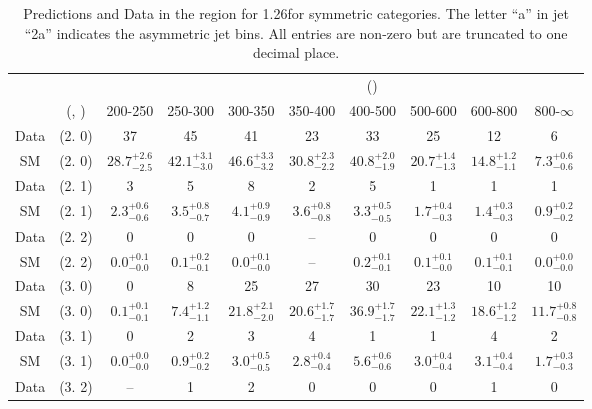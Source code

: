 \begin{table}[h!]
\tiny
\centering
\caption{Predictions and Data in the \mmj region for 1.26\ifb for symmetric categories. The letter ``a'' in jet \eg ``2a''  indicates the asymmetric jet bins. All entries are non-zero but are truncated to one decimal place.\label{tab:predall_mumu_comb_sym}}
\begin{tabular}
{cccccccccc}
	\hline\hline
&	&	& \multicolumn{8}{c}{\scalht (\gev)}\\ 
	&	 (\njet, \nb) & 200-250 & 250-300 & 300-350 & 350-400 & 400-500 & 500-600 & 600-800 & 800-$\infty$ \\ [0.8ex] 
\hline
	Data & (2. 0) & 37 & 45 & 41 & 23 & 33 & 25 & 12 & 6 \\[0.5ex] 
	SM & (2. 0) & $28.7^{+ 2.6 }_{- 2.5 }$ & $42.1^{+ 3.1 }_{- 3.0 }$ & $46.6^{+ 3.3 }_{- 3.2 }$ & $30.8^{+ 2.3 }_{- 2.2 }$ & $40.8^{+ 2.0 }_{- 1.9 }$ & $20.7^{+ 1.4 }_{- 1.3 }$ & $14.8^{+ 1.2 }_{- 1.1 }$ & $7.3^{+ 0.6 }_{- 0.6 }$ \\[0.5ex] 
	Data & (2. 1) & 3 & 5 & 8 & 2 & 5 & 1 & 1 & 1 \\[0.5ex] 
	SM & (2. 1) & $2.3^{+ 0.6 }_{- 0.6 }$ & $3.5^{+ 0.8 }_{- 0.7 }$ & $4.1^{+ 0.9 }_{- 0.9 }$ & $3.6^{+ 0.8 }_{- 0.8 }$ & $3.3^{+ 0.5 }_{- 0.5 }$ & $1.7^{+ 0.4 }_{- 0.3 }$ & $1.4^{+ 0.3 }_{- 0.3 }$ & $0.9^{+ 0.2 }_{- 0.2 }$ \\[0.5ex] 
	Data & (2. 2) & 0 & 0 & 0 & -- & 0 & 0 & 0 & 0 \\[0.5ex] 
	SM & (2. 2) & $0.0^{+ 0.1 }_{- 0.0 }$ & $0.1^{+ 0.2 }_{- 0.1 }$ & $0.0^{+ 0.1 }_{- 0.0 }$ & -- & $0.2^{+ 0.1 }_{- 0.1 }$ & $0.1^{+ 0.1 }_{- 0.0 }$ & $0.1^{+ 0.1 }_{- 0.1 }$ & $0.0^{+ 0.0 }_{- 0.0 }$ \\[0.5ex] 
	Data & (3. 0) & 0 & 8 & 25 & 27 & 30 & 23 & 10 & 10 \\[0.5ex] 
	SM & (3. 0) & $0.1^{+ 0.1 }_{- 0.1 }$ & $7.4^{+ 1.2 }_{- 1.1 }$ & $21.8^{+ 2.1 }_{- 2.0 }$ & $20.6^{+ 1.7 }_{- 1.7 }$ & $36.9^{+ 1.7 }_{- 1.7 }$ & $22.1^{+ 1.3 }_{- 1.2 }$ & $18.6^{+ 1.2 }_{- 1.2 }$ & $11.7^{+ 0.8 }_{- 0.8 }$ \\[0.5ex] 
	Data & (3. 1) & 0 & 2 & 3 & 4 & 1 & 1 & 4 & 2 \\[0.5ex] 
	SM & (3. 1) & $0.0^{+ 0.0 }_{- 0.0 }$ & $0.9^{+ 0.2 }_{- 0.2 }$ & $3.0^{+ 0.5 }_{- 0.5 }$ & $2.8^{+ 0.4 }_{- 0.4 }$ & $5.6^{+ 0.6 }_{- 0.6 }$ & $3.0^{+ 0.4 }_{- 0.4 }$ & $3.1^{+ 0.4 }_{- 0.4 }$ & $1.7^{+ 0.3 }_{- 0.3 }$ \\[0.5ex] 
	Data & (3. 2) & -- & 1 & 2 & 0 & 0 & 0 & 1 & 0 \\[0.5ex] 

\end{tabular}
\end{table}
